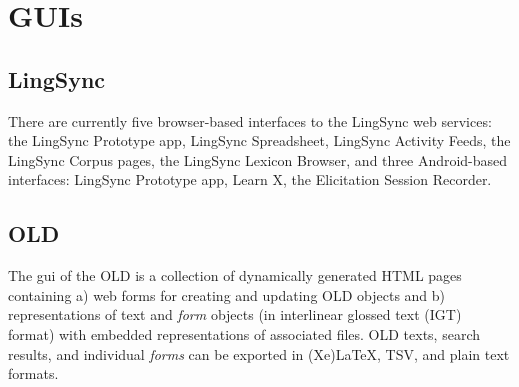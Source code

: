 \documentclass[11pt]{article}
\begin{document}
\section{GUIs}


\subsection{LingSync}

There are currently five browser-based interfaces to the LingSync web services:
the LingSync Prototype app, LingSync Spreadsheet, LingSync Activity Feeds, the
LingSync Corpus pages,  the LingSync Lexicon Browser, and three Android-based interfaces: LingSync Prototype app, Learn X, the Elicitation Session Recorder.
%
%



\subsection{OLD}

The \gls{gui} of the OLD %
is a collection of dynamically generated HTML pages containing a) web forms for
creating and updating OLD objects and b) representations of text and
\emph{form} objects (in interlinear glossed text (IGT) format) with embedded
representations of associated files. OLD texts, search results, and individual
\emph{forms} can be exported in (Xe)LaTeX, TSV, and plain text formats.
\end{document}
